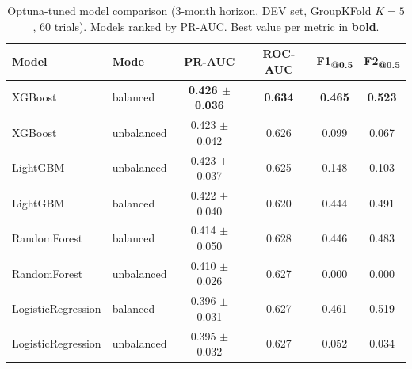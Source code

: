 \begin{table}[ht]
\centering
\caption[Optuna-tuned model comparison, 3-month horizon]{Optuna-tuned model comparison (3-month horizon, DEV set, GroupKFold $K\!=\!5$, 60 trials). Models ranked by PR-AUC. Best value per metric in \textbf{bold}.}
\label{tab:step5v2_tuning_3m}
\small
\begin{tabular}{llcccc}
\toprule
Model & Mode & PR-AUC & ROC-AUC & F1\textsubscript{@0.5} & F2\textsubscript{@0.5} \\
\midrule
XGBoost & balanced & \textbf{0.426 $\pm$ 0.036} & \textbf{0.634} & \textbf{0.465} & \textbf{0.523} \\
XGBoost & unbalanced & 0.423 $\pm$ 0.042 & 0.626 & 0.099 & 0.067 \\
LightGBM & unbalanced & 0.423 $\pm$ 0.037 & 0.625 & 0.148 & 0.103 \\
LightGBM & balanced & 0.422 $\pm$ 0.040 & 0.620 & 0.444 & 0.491 \\
RandomForest & balanced & 0.414 $\pm$ 0.050 & 0.628 & 0.446 & 0.483 \\
RandomForest & unbalanced & 0.410 $\pm$ 0.026 & 0.627 & 0.000 & 0.000 \\
LogisticRegression & balanced & 0.396 $\pm$ 0.031 & 0.627 & 0.461 & 0.519 \\
LogisticRegression & unbalanced & 0.395 $\pm$ 0.032 & 0.627 & 0.052 & 0.034 \\
\bottomrule
\end{tabular}
\end{table}
